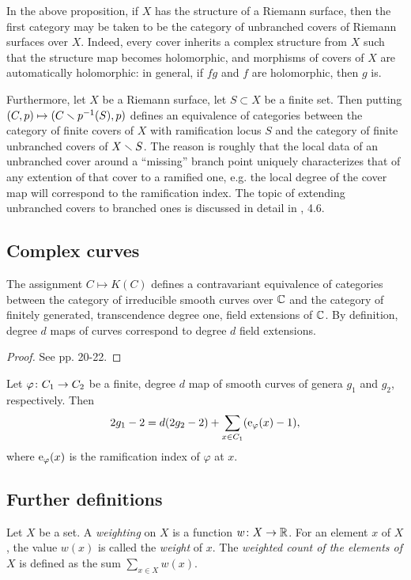 \begin{rmk}
 In the above proposition, if $X$ has the structure of a Riemann surface, then the first category may be taken to be the category of unbranched covers of Riemann surfaces over $X$. Indeed, every cover inherits a complex structure from $X$ such that the structure map becomes holomorphic, and morphisms of covers of $X$ are automatically holomorphic: in general, if $fg$ and $f$ are holomorphic, then $g$ is.
 
 Furthermore, let $X$ be a Riemann surface, let $S\subset X$ be a finite set. Then putting $(C,p)\mapsto (C\smallsetminus p^{-1}(S),p)$ defines an equivalence of categories between the category of finite covers of $X$ with ramification locus $S$ and the category of finite unbranched covers of $X\smallsetminus S$. The reason is roughly that the local data of an unbranched cover around a ``missing'' branch point uniquely characterizes that of any extention of that cover to a ramified one, e.g. the local degree of the cover map will correspond to the ramification index. The topic of extending unbranched covers to branched ones is discussed in detail in \cite{Lamotke2005}, 4.6.
\end{rmk}


\subsection{Complex curves}

\begin{prop} \label{prop:curves-to-fields}
 The assignment $C\mapsto K(C)$ defines a contravariant equivalence of categories between the category of irreducible smooth curves over $\mathbb{C}$ 
and the 
category of finitely generated, transcendence degree one, field extensions of $\mathbb{C}$. By definition, degree $d$ maps of curves correspond 
to degree $d$ field extensions.
\end{prop}

\begin{proof}
 See \cite{Silverman2009} pp. 20-22.
\end{proof}

\begin{prop} \label{prop:hurwitz}
 Let $\varphi \colon C_1 \to C_2$ be a finite, degree $d$ map of smooth curves of genera $g_1$ and $g_2$, respectively. Then \[2g_1-2 = d(2g_2-2) + 
\sum_{x\in C_1}(\operatorname{e}_{\varphi}(x)-1),\] where $\operatorname{e}_\varphi(x)$ is the ramification index of $\varphi$ at $x$.
\end{prop}

\subsection{Further definitions}

\begin{defi}
 Let $X$ be a set. A \emph{weighting} on $X$ is a function $w\colon X\to\mathbb{R}$. For an element $x$ of $X$, the value $w(x)$ is called the \emph{weight} of $x$. The \emph{weighted count of the elements of $X$} is defined as the sum $\sum_{x\in X}w(x)$. 
\end{defi}
